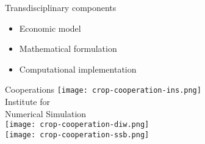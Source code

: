   \begin{frame}{Transdisciplinary components}

  \begin{itemize}\setlength\itemsep{1em}
  \item Economic model
  \item Mathematical formulation
  \item Computational implementation
  \end{itemize}
  \end{frame}
  \begin{frame}{Cooperations}
  	\centering   \vspace{0.5cm}
  	\texttt{[image: crop-cooperation-ins.png]} \\\vspace{-0.5cm}
  	\footnotesize{Institute for \\ Numerical Simulation}\vspace{0.3cm}   \\ \vspace{0.5cm}
  	\texttt{[image: crop-cooperation-diw.png]} \\ \vspace{0.5cm}
  	\texttt{[image: crop-cooperation-ssb.png]} 
%  		
%  	
%  	
\end{frame}
